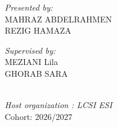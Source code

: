 \begin{titlepage}
\noindent
\begin{minipage}{0.5\textwidth}
    
  \begin{flushleft} \large
    \emph{Presented by:}\\
    MAHRAZ ABDELRAHMEN
    ~\\
    REZIG HAMAZA
  \end{flushleft}
\end{minipage}
\begin{minipage}{0.4\textwidth}
  \begin{flushleft} \large
    \emph{Supervised by:} \\
    MEZIANI Lila
    ~\\
     GHORAB SARA
  \end{flushleft}
\end{minipage}\\[0.8cm]

{\large \textit{Host organization : LCSI ESI}}\\[0.8cm]

\vfill
{\large Cohort: 2026/2027}

\end{titlepage}
